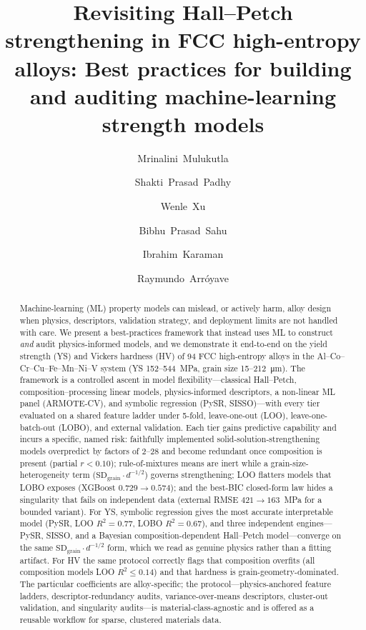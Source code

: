 \documentclass[5p,times,twocolumn]{elsarticle}
\begin{document}
\begin{frontmatter}

\title{Revisiting Hall--Petch strengthening in FCC high-entropy alloys: Best practices for building and auditing machine-learning strength models}

\author[mse]{Mrinalini~Mulukutla}
\author[mse]{Shakti~Prasad~Padhy}
\author[mse]{Wenle~Xu}
\author[mse]{Bibhu~Prasad~Sahu}
\author[mse]{Ibrahim~Karaman}
\author[mse]{Raymundo~Arr\'{o}yave}


\begin{abstract}
Machine-learning (ML) property models can mislead, or actively harm, alloy design when physics, descriptors, validation strategy, and deployment limits are not handled with care. We present a best-practices framework that instead uses ML to construct \emph{and} audit physics-informed models, and we demonstrate it end-to-end on the yield strength (YS) and Vickers hardness (HV) of 94 FCC high-entropy alloys in the Al--Co--Cr--Cu--Fe--Mn--Ni--V system (YS 152--544~\si{MPa}, grain size 15--212~\si{\micro\meter}). The framework is a controlled ascent in model flexibility---classical Hall--Petch, composition--processing linear models, physics-informed descriptors, a non-linear ML panel (ARMOTE-CV), and symbolic regression (PySR, SISSO)---with every tier evaluated on a shared feature ladder under 5-fold, leave-one-out (LOO), leave-one-batch-out (LOBO), and external validation. Each tier gains predictive capability and incurs a specific, named risk: faithfully implemented solid-solution-strengthening models overpredict by factors of 2--28 and become redundant once composition is present (partial $r < 0.10$); rule-of-mixtures means are inert while a grain-size-heterogeneity term ($\text{SD}_\text{grain}\cdot d^{-1/2}$) governs strengthening; LOO flatters models that LOBO exposes (XGBoost $0.729 \to 0.574$); and the best-BIC closed-form law hides a singularity that fails on independent data (external RMSE $421 \to 163$~\si{MPa} for a bounded variant). For YS, symbolic regression gives the most accurate interpretable model (PySR, LOO $R^2 = 0.77$, LOBO $R^2 = 0.67$), and three independent engines---PySR, SISSO, and a Bayesian composition-dependent Hall--Petch model---converge on the same $\text{SD}_\text{grain}\cdot d^{-1/2}$ form, which we read as genuine physics rather than a fitting artifact. For HV the same protocol correctly flags that composition overfits (all composition models LOO $R^2 \leq 0.14$) and that hardness is grain-geometry-dominated. The particular coefficients are alloy-specific; the protocol---physics-anchored feature ladders, descriptor-redundancy audits, variance-over-means descriptors, cluster-out validation, and singularity audits---is material-class-agnostic and is offered as a reusable workflow for sparse, clustered materials data.
\end{abstract}


\end{frontmatter}
\end{document}
